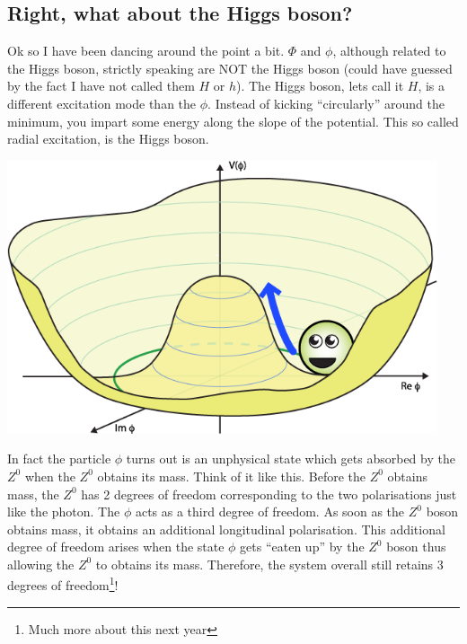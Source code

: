 \subsection{Right, what about the Higgs boson?}
Ok so I have been dancing around the point a bit. $\Phi$ and $\phi$, although related to the Higgs boson, strictly speaking are NOT the Higgs boson (could have guessed by the fact I have not called them $H$ or $h$). The Higgs boson, lets call it $H$, is a different excitation mode than the $\phi$. Instead of kicking ``circularly'' around the minimum, you impart some energy along the slope of the potential. This so called radial excitation, is the Higgs boson. 
\begin{center}
\includegraphics[width=0.95\textwidth]{fig/higgs/phi_higgs.png}
\end{center}

In fact the particle $\phi$ turns out is an unphysical state which gets absorbed by the $Z^0$ when the $Z^0$ obtains its mass. Think of it like this. Before the $Z^0$ obtains mass, the $Z^0$ has 2 degrees of freedom corresponding to the two polarisations just like the photon. The $\phi$ acts as a third degree of freedom. As soon as the $Z^0$ boson obtains mass, it obtains an additional longitudinal polarisation. This additional degree of freedom arises when the state $\phi$ gets ``eaten up'' by the $Z^0$ boson thus allowing the $Z^0$ to obtains its mass. Therefore, the system overall still retains 3 degrees of freedom\footnote{Much more about this next year}! 

